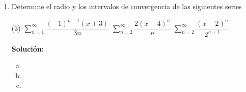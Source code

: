 \documentclass[12pt]{article}
\newenvironment{solucion}
{\begin{mdframed}[backgroundcolor=black!10]
		{\bf Solución:}\\
	}
	{
	\end{mdframed}
}
\newenvironment{preguntas}
{\begin{enumerate}\itemsep12pt
	}
	{
	\end{enumerate}
}
\newcommand{\ra}{\rightarrow}
\begin{document}
\begin{preguntas}
\begin{solucion}
\begin{enumerate}[a)]
\item $\sum\limits_{n=1}^{\infty}\dfrac{(-1)^{n+1}}{\sqrt[]{n}}$\\
			\\
			Veamos el límite de la sucesión,
			$$\lim_{n\ra\infty} |a_n| = \lim_{n\ra\infty} \dfrac{1}{\sqrt[]{n}} = 0$$
			Además, notemos que 
			$$\dfrac{1}{\sqrt[]{n}} > \dfrac{1}{\sqrt[]{n+1}} \ra \dfrac{1}{n} > \dfrac{1}{n+1} \ra n < n+1$$
			Por lo que la sucesión es decreciente.\\
			\\
			Dicho esto, por el criterio de Leibniz, la serie converge.\\
			\\
			Veamos ahora que pasa con la serie no alternante 
			$$\sum\limits_{n=1}^{\infty}\dfrac{1}{\sqrt[]{n}} = \sum\limits_{n=1}^{\infty}\dfrac{1}{n^{1/2}}$$
			Es una serie-p con $p<1$, por lo que es divergente.\\
			\\
			Finalmente, la serie converge condicionalmente.
\item $\sum\limits_{n=2}^{\infty}\dfrac{(-1)^{n-1}(2n-1)}{(\sqrt[]{2})^n}$\\
			\\
			Veamos el límite de la sucesión,
			$$\lim_{n\ra\infty} |a_n| = \lim_{n\ra\infty} \dfrac{2n-1}{(\sqrt[]{2})^n} = 0$$
			Usando el criterio de la razón,
			$$\lim\limits_{n \ra \infty} \left|\dfrac{a_{n+1}}{a_n}\right|
			= \lim\limits_{n \ra \infty} \dfrac{2n+2-1}{(\sqrt[]{2})^{\cancel{n+1}}} \cdot \dfrac{(\cancel{\sqrt[]{2})^n}}{2n-1}
			= \lim\limits_{n \ra \infty} \dfrac{2n+1}{(2n-1)(\sqrt[]{2})} = \dfrac{1}{\sqrt[]{2}} < 1$$
			Por lo tanto, la serie no alternante converge, lo que implica que la alternante también. En conclusióm, la serie converge absolutamente.
\item $\sum\limits_{n=2}^{\infty}\dfrac{(-1)^{n-1}(n+1)}{n}$\\
			\\
			Veamos el límite de la sucesión,
			$$\lim_{n\ra\infty} |a_n| = \lim_{n\ra\infty}\dfrac{(n+1)}{n} = 1 \neq 0$$
			Por la prueba de la divergencia, la serie es divergente.
\end{enumerate}
\end{solucion}
\item Determine el radio y los intervalos de convergencia de las siguientes series
\begin{tasks}(3)
\task $\sum\limits_{n=1}^{\infty}\dfrac{(-1)^{n-1}(x+3)}{3n}$
\task $\sum\limits_{n=2}^{\infty}\dfrac{2(x-4)^n}{n}$
\task $\sum\limits_{n=2}^{\infty}\dfrac{(x-2)^n}{2^{n+1}}$
\end{tasks}
\begin{solucion}

\begin{enumerate}[a)]
\item 
\item 
\item 
\end{enumerate}
\end{solucion}
\end{preguntas}
\end{document}
